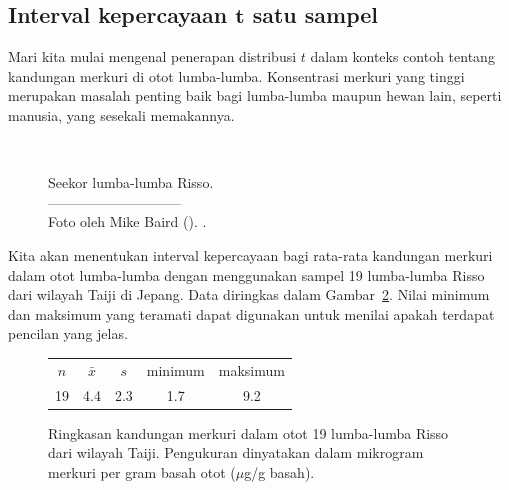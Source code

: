 

\D{\newpage}

\subsection[Interval kepercayaan $t$ satu sampel]
    {Interval kepercayaan $\pmb{t}$ satu sampel}
\label{oneSampleTConfidenceIntervals}


Mari kita mulai mengenal penerapan distribusi $t$
dalam konteks contoh tentang kandungan merkuri
di otot lumba-lumba.
Konsentrasi merkuri yang tinggi merupakan masalah penting
baik bagi lumba-lumba
maupun hewan lain, seperti manusia, yang sesekali memakannya.
\captionsetup{width=86mm}

\begin{figure}[h]
\centering
{}  \\
\addvspace{2mm}
\begin{minipage}{\textwidth}
   \caption[rissosDolphinPic]{Seekor lumba-lumba Risso.\vspace{-1mm} \\
   -----------------------------\vspace{-2mm}\\
   {\footnotesize Foto oleh Mike Baird (). .}\vspace{-8mm}}
   \label{rissosDolphin}
\end{minipage}
\stdvspace{}
\end{figure}
\captionsetup{width=\mycaptionwidth}

Kita akan menentukan interval kepercayaan bagi rata-rata kandungan merkuri dalam otot lumba-lumba dengan menggunakan sampel 19 lumba-lumba Risso dari wilayah Taiji di Jepang. Data diringkas dalam Gambar~\ref{summaryStatsOfHgInMuscleOfRissosDolphins}. Nilai minimum dan maksimum yang teramati dapat digunakan untuk menilai apakah terdapat pencilan yang jelas.

\begin{figure}[h]
\centering
\begin{tabular}{ccc cc}
\hline
$n$ & $\bar{x}$ & $s$ & minimum & maksimum \\
19   & 4.4	  & 2.3  & 1.7	       & 9.2 \\
\hline
\end{tabular}
\caption{Ringkasan kandungan merkuri dalam otot
    19 lumba-lumba Risso dari wilayah Taiji.
    Pengukuran dinyatakan dalam mikrogram merkuri per gram basah
    otot ($\mu$g/g basah).}
\label{summaryStatsOfHgInMuscleOfRissosDolphins}
\end{figure}

